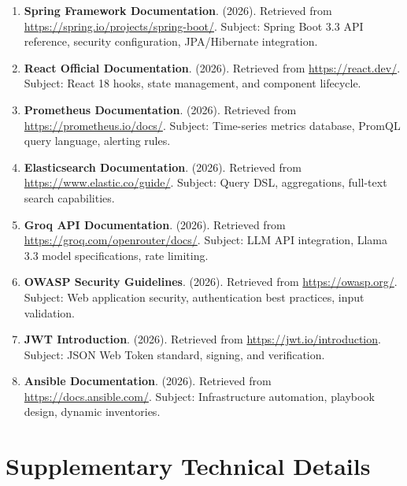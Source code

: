 \documentclass[12pt,a4paper]{report}
\begin{document}
\begin{enumerate}
  \item \textbf{Spring Framework Documentation}. (2026). Retrieved from \url{https://spring.io/projects/spring-boot/}. Subject: Spring Boot 3.3 API reference, security configuration, JPA/Hibernate integration.
  
  \item \textbf{React Official Documentation}. (2026). Retrieved from \url{https://react.dev/}. Subject: React 18 hooks, state management, and component lifecycle.
  
  \item \textbf{Prometheus Documentation}. (2026). Retrieved from \url{https://prometheus.io/docs/}. Subject: Time-series metrics database, PromQL query language, alerting rules.
  
  \item \textbf{Elasticsearch Documentation}. (2026). Retrieved from \url{https://www.elastic.co/guide/}. Subject: Query DSL, aggregations, full-text search capabilities.
  
  \item \textbf{Groq API Documentation}. (2026). Retrieved from \url{https://groq.com/openrouter/docs/}. Subject: LLM API integration, Llama 3.3 model specifications, rate limiting.
  
  \item \textbf{OWASP Security Guidelines}. (2026). Retrieved from \url{https://owasp.org/}. Subject: Web application security, authentication best practices, input validation.
  
  \item \textbf{JWT Introduction}. (2026). Retrieved from \url{https://jwt.io/introduction}. Subject: JSON Web Token standard, signing, and verification.
  
  \item \textbf{Ansible Documentation}. (2026). Retrieved from \url{https://docs.ansible.com/}. Subject: Infrastructure automation, playbook design, dynamic inventories.
\end{enumerate}

\newpage

\appendix

\chapter{Supplementary Technical Details}
\end{document}
